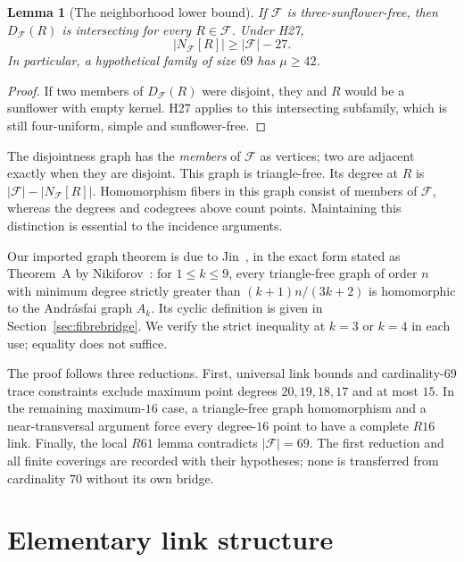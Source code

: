 \documentclass[11pt,a4paper]{article}
\numberwithin{equation}{section}
\newtheorem{lemma}[theorem]{Lemma}
\theoremstyle{remark}
\newcommand{\F}{\mathcal F}
\begin{document}
\begin{lemma}[The neighborhood lower bound]
\label{lem:h27}
If $\F $ is three-sunflower-free, then $ D_{\F}(R)$ is intersecting for every
$ R\in\F $. Under H27,
\[
 \lvert N_{\F}[R]\rvert\ge\lvert\F\rvert-27.
\]
In particular, a hypothetical family of size $69$ has $\mu\ge 42$.
\end{lemma}
\begin{proof}
If two members of $ D_{\F}(R)$ were disjoint, they and $ R $ would be a
sunflower with empty kernel. H27 applies to this intersecting subfamily,
which is still four-uniform, simple and sunflower-free.
\end{proof}

The disjointness graph has the \emph{members} of $\F $ as vertices; two are
adjacent exactly when they are disjoint. This graph is triangle-free.
Its degree at $ R $ is $\lvert\F\rvert-\lvert N_{\F}[R]\rvert $.
Homomorphism fibers in this graph consist of members of $\F $, whereas the
degrees and codegrees above count points. Maintaining this distinction is
essential to the incidence arguments.

Our imported graph theorem is due to Jin~\cite{JIN1993}, in the exact
form stated as Theorem~A by Nikiforov~\cite{NIK2010}: for
$1\le k\le 9$, every triangle-free graph of order $n$ with
minimum degree strictly greater than $(k+1)n/(3k+2)$ is homomorphic
to the Andr\'asfai graph $A_k$. Its cyclic definition is given in
Section~\ref{sec:fibrebridge}. We verify the strict inequality at
$k=3$ or $k=4$ in each use; equality does not suffice.

The proof follows three reductions. First, universal link bounds and
cardinality-$69$ trace constraints exclude maximum point degrees
$20,19,18,17$ and at most $15$. In the remaining maximum-$16$ case, a
triangle-free graph homomorphism and a near-transversal argument force
every degree-$16$ point to have a complete $ R16$ link. Finally, the
local $ R61$ lemma contradicts $\lvert\F\rvert=69$. The first
reduction and all finite coverings are recorded with their hypotheses;
none is transferred from cardinality $70$ without its own bridge.

\section{Elementary link structure}
\label{sec:foundations}
\end{document}
